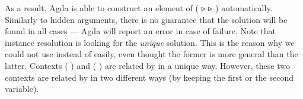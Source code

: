 
As a result, Agda is able to construct an element of
  (   ▹  ▹ ) automatically.
Similarly
to hidden arguments, there is no guarantee that the solution will be found
in all cases --- Agda will report an error in case of failure.
Note that instance resolution is looking for the \emph{unique} solution.
This is the reason why we could not use  instead of  easily,
even thought the former is more general than the latter.
Contexts (  ) and (    )
are related by  in a unique way.  However, these two contexts are
related by  in two different ways (by keeping the first or the
second variable).

